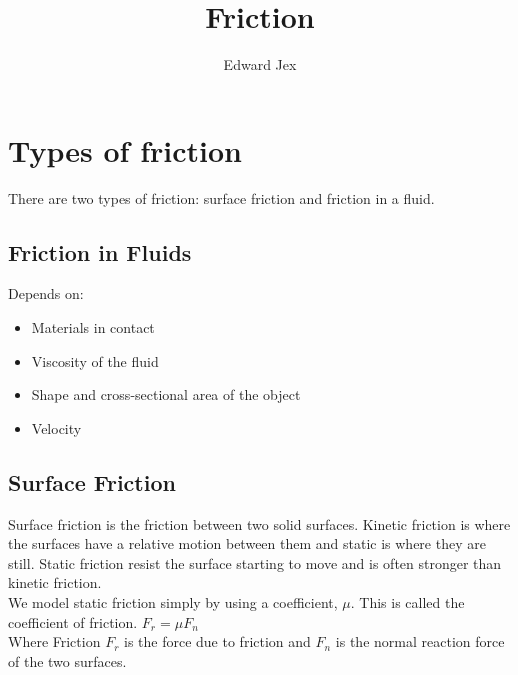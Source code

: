 \documentclass[a4paper,12pt]{article}
\begin{document}
\title{Friction}	
\author{Edward Jex}
\maketitle
\section*{Types of friction}
There are two types of friction: surface friction and friction in a fluid.
\subsection*{Friction in Fluids}
Depends on:
\begin{itemize}
	\item Materials in contact
	\item Viscosity of the fluid
	\item Shape and cross-sectional area of the object
	\item Velocity
\end{itemize}
\subsection*{Surface Friction} 
Surface friction is the friction between two solid surfaces. Kinetic friction is where the surfaces have a relative motion between them and static is where they are still. Static friction resist the surface starting to move and is often stronger than kinetic friction. \\
We model static friction simply by using a coefficient, $\mu$. This is called the coefficient of friction. 
$F_r = \mu F_n$ \\
Where Friction $F_r$ is the force due to friction and $F_n$ is the normal reaction force of the two surfaces. 
\end{document}
